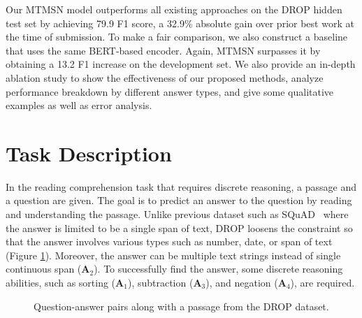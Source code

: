 \documentclass[11pt,a4paper]{article}
\begin{document}
Our MTMSN model outperforms all existing approaches on the DROP hidden test set by achieving 79.9 F1 score, a 32.9\% absolute gain over prior best work at the time of submission. 
To make a fair comparison, we also construct a baseline that uses the same BERT-based encoder.
Again, MTMSN surpasses it by obtaining a 13.2 F1 increase on the development set.
We also provide an in-depth ablation study to show the effectiveness of our proposed methods, analyze performance breakdown by different answer types, and give some qualitative examples as well as error analysis. \section{Task Description}
In the reading comprehension task that requires discrete reasoning, a passage and a question are given.
The goal is to predict an answer to the question by reading and understanding the passage.
Unlike previous dataset such as SQuAD~\cite{Rajpurkar16} where the answer is limited to be a single span of text, DROP loosens the constraint so that the answer involves various types such as number, date, or span of text (Figure \ref{fig:drop-example}). 
Moreover, the answer can be multiple text strings instead of single continuous span ($\mathbf{A}_2$).
To successfully find the answer, some discrete reasoning abilities, such as sorting ($\mathbf{A}_1$), subtraction ($\mathbf{A}_3$), and negation ($\mathbf{A}_4$), are required.

\begin{figure}[t]
\center
{}
\caption{Question-answer pairs along with a passage from the DROP dataset.}
\label{fig:drop-example}
\end{figure}
\end{document}
